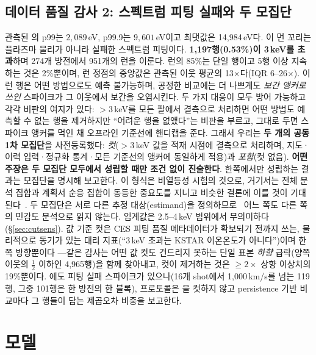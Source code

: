 \documentclass[10pt,a4paper]{article}
\begin{document}
\subsection{데이터 품질 감사 2: \Ti{} 스펙트럼 피팅 실패와 두 모집단}
\label{sec:spikes}
관측된 \Ti{}의 p99는 $2{,}089$\,eV, p99.9는 $9{,}601$\,eV이고 최댓값은
14{,}984\,eV다. 이 먼 꼬리는 플라즈마 물리가 아니라 실패한 스펙트럼 피팅이다.
\textbf{1{,}197행(0.53\%)이 3\,keV를 초과}하며 274개 방전에서 951개의 런을
이룬다. 런의 85\%는 단일 행이고 5행 이상 지속하는 것은 2\%뿐이며, 런 정점의
중앙값은 관측된 이웃 평균의 13$\times$다(IQR 6--26$\times$). 이런 행은 어떤
방법으로도 예측 불가능하며, 공정한 비교에는 더 나쁘게도 \emph{보간 앵커로 쓰인}
스파이크가 그 이웃에서 보간을 오염시킨다. 두 가지 대응이 모두 방어 가능하고
각각 비판의 여지가 있다: $>$3\,keV를 모든 팔에서 결측으로 처리하면 어떤 방법도
예측할 수 없는 행을 제거하지만 ``어려운 행을 없앴다''는 비판을 부르고, 그대로
두면 스파이크 앵커를 먹인 채 오프라인 기준선에 핸디캡을 준다. 그래서 우리는
\textbf{두 개의 공동 1차 모집단}을 사전등록했다: \emph{컷}($>$3\,keV 값을 적재
시점에 결측으로 처리하며, 지도·이력 입력·정규화 통계·모든 기준선의 앵커에
동일하게 적용)과 \emph{포함}(컷 없음). \textbf{어떤 주장은 두 모집단 모두에서
성립할 때만 조건 없이 진술한다}. 한쪽에서만 성립하는 결과는 모집단을 명시해
보고한다. 이 형식은 비열등성 시험의 것으로, 거기서는 전체 분석 집합과 계획서 순응
집합이 동등한 중요도를 지니고 비슷한 결론에 이를 것이
기대된다~\citep{CPMP2000Switching}. 두 모집단은 서로 다른 추정
대상(estimand)을 정의하므로~\citep{ICH2019E9R1} 어느 쪽도 다른 쪽의 민감도 분석으로
읽지 않는다. 임계값은 2.5--4\,keV 범위에서 무의미하다(\S\ref{sec:cutsens}). 값
기준 컷은 CES 피팅 품질 메타데이터가 확보되기 전까지 쓰는, 물리적으로 동기가
있는 대리 지표(``3\,keV 초과는 KSTAR 이온온도가 아니다'')이며 한쪽 방향뿐이다
---같은 감사는 어떤 값 컷도 건드리지 못하는 단일 표본 \emph{하향}
급락(양쪽 이웃의 $\tfrac12$ 이하인 4{,}965행)을 함께 찾아내고, 컷이 제거하는
것은 $\geq 2\times$ 상향 이상치의 19\%뿐이다. \Vrot{}에도 피팅 실패 스파이크가
있으나(16개 shot에서 1{,}000\,km/s를 넘는 119행, 그중 101행은 한 방전의 한
블록), 프로토콜은 \Vrot{}을 컷하지 않고 persistence 기반 \Vrot{} 비교마다 그
행들이 담는 제곱오차 비중을 보고한다.

\section{모델}
\label{sec:model}
\end{document}
